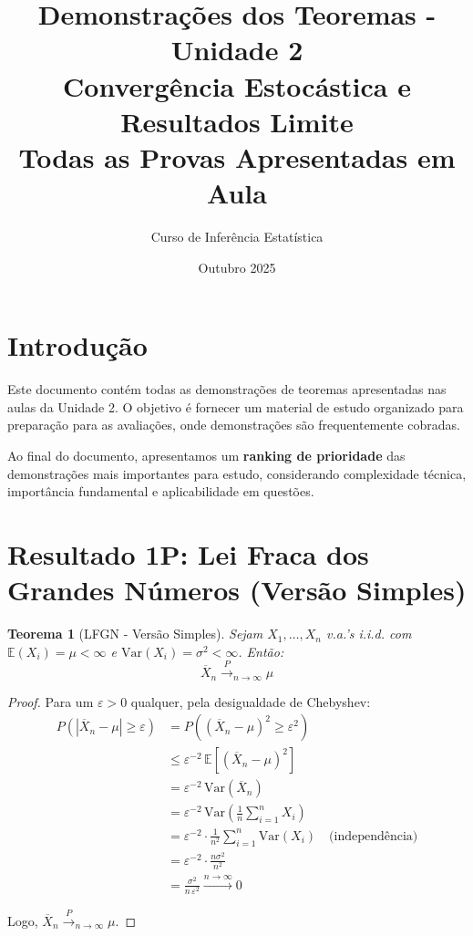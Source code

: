 \documentclass[12pt,a4paper]{article}
\title{Demonstrações dos Teoremas - Unidade 2\\
\large Convergência Estocástica e Resultados Limite\\
\normalsize Todas as Provas Apresentadas em Aula}
\author{Curso de Inferência Estatística}
\date{Outubro 2025}
\theoremstyle{plain}
\newtheorem{teorema}{Teorema}[section]
\theoremstyle{definition}
\theoremstyle{remark}
\begin{document}
\maketitle
\tableofcontents
\newpage

\section{Introdução}

Este documento contém todas as demonstrações de teoremas apresentadas nas aulas da Unidade 2. O objetivo é fornecer um material de estudo organizado para preparação para as avaliações, onde demonstrações são frequentemente cobradas.

Ao final do documento, apresentamos um \textbf{ranking de prioridade} das demonstrações mais importantes para estudo, considerando complexidade técnica, importância fundamental e aplicabilidade em questões.

\section{Resultado 1P: Lei Fraca dos Grandes Números (Versão Simples)}

\begin{teorema}[LFGN - Versão Simples]
Sejam $X_1, \ldots, X_n$ v.a.'s i.i.d. com $\mathbb{E}(X_i) = \mu < \infty$ e $\mathrm{Var}(X_i) = \sigma^2 < \infty$. Então:
\[
\overline{X}_n \xrightarrow{P}_{n \to \infty} \mu
\]
\end{teorema}

\begin{proof}
Para um $\varepsilon > 0$ qualquer, pela desigualdade de Chebyshev:
\begin{align}
P\left( \left| \overline{X}_n - \mu \right| \geq \varepsilon \right) &= P\left( \left( \overline{X}_n - \mu \right)^2 \geq \varepsilon^2 \right) \\
&\leq \varepsilon^{-2} \, \mathbb{E} \left[ \left( \overline{X}_n - \mu \right)^2 \right] \\
&= \varepsilon^{-2} \, \mathrm{Var}(\overline{X}_n) \\
&= \varepsilon^{-2} \, \mathrm{Var}\left(\frac{1}{n}\sum_{i=1}^n X_i\right) \\
&= \varepsilon^{-2} \cdot \frac{1}{n^2} \sum_{i=1}^n \mathrm{Var}(X_i) \quad \text{(independência)} \\
&= \varepsilon^{-2} \cdot \frac{n\sigma^2}{n^2} \\
&= \frac{\sigma^2}{n \, \varepsilon^2} \xrightarrow{n \to \infty} 0
\end{align}

Logo, $\overline{X}_n \xrightarrow{P}_{n \to \infty} \mu$.
\end{proof}
\end{document}
